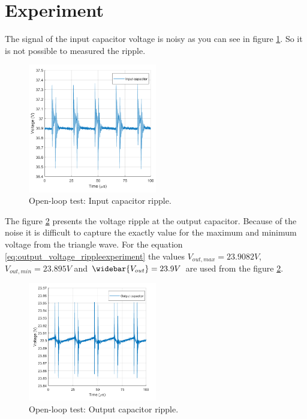 \section{Experiment}

The signal of the input capacitor voltage is noisy as you can see in figure \ref{Openlooptestinputcapacitor}. So it is not possible to measured the ripple.

\begin{figure}[H]
	\begin{center}
		\includegraphics[width=0.5\textwidth]{../Pictures/P1/Test/Openloopinputcapacitor}
		\caption{Open-loop test: Input capacitor ripple.}
		\label{Openlooptestinputcapacitor}
	\end{center}	
\end{figure}

The figure \ref{Openlooptestoutputtcapacitor} presents the voltage ripple at the output capacitor. Because of the noise it is difficult to capture the exactly value for the maximum and minimum voltage from the triangle wave. For the equation \ref{eq:output_voltage_rippleexperiment} the values $V_{out,max} = 23.9082V$, $V_{out,min} = 23.895V$ and $\widebar{V_{out}} = 23.9V$ are used from the figure  \ref{Openlooptestoutputtcapacitor}.

\begin{figure}[H]
	\begin{center}
		\includegraphics[width=0.5\textwidth]{../Pictures/P1/Test/Openloopoutputcapacitor}
		\caption{Open-loop test: Output capacitor ripple.}
		\label{Openlooptestoutputtcapacitor}
	\end{center}	
\end{figure}

